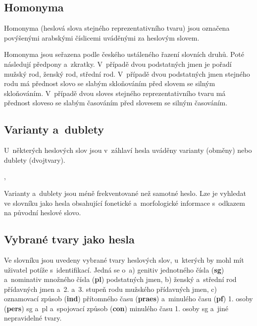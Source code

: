 \subsection*{Homonyma}

Homonyma (heslová slova stejného reprezentativního tvaru) jsou označena povýšenými arabskými číslicemi uváděnými za heslovým slovem.

\blspace
  \dicEntry {}  
  \dicEntry {}  
\blspace

Homonyma jsou seřazena podle českého ustáleného řazení slovních druhů. Poté následují předpony a~zkratky.
V~případě dvou podstatných jmen je pořadí mužský rod, ženský rod, střední rod. V~případě dvou podstatných jmen stejného rodu má přednost slovo se slabým skloňováním před slovem se silným skloňováním. V~případě dvou sloves stejného reprezentativního tvaru má přednost sloveso se slabým časováním před slovesem se silným časováním.

\subsection*{Varianty a~dublety}

U~některých heslových slov jsou v~záhlaví hesla uváděny varianty (obměny) nebo dublety (dvojtvary).

\blspace
  \dicEntry {},  
  \dicEntry {} 
\blspace

Varianty a~dublety jsou méně frekventované než samotné heslo. Lze je vyhledat ve slovníku jako hesla obsahující fonetické a~morfologické informace s~odkazem na původní heslové slovo.

\blspace
  \dicEntry {}    
  \dicEntry {}    
\blspace

\subsection*{Vybrané tvary jako hesla}

Ve slovníku jsou uvedeny vybrané tvary heslových slov, u~kterých by mohl mít uživatel potíže s~identifikací. Jedná se o~a) genitiv jednotného čísla ({\textbf{sg}}) a~nominativ množného čísla ({\textbf{pl}}) podstatných jmen, b) ženský a~střední rod přídavných jmen a~2. a~3. stupeň rodu mužského přídavných jmen, c) oznamovací způsob ({\textbf{ind}}) přítomného času ({\textbf{praes}}) a~minulého času ({\textbf{pf}}) 1. osoby ({\textbf{pers}}) sg a~pl a~spojovací způsob ({\textbf{con}}) minulého času 1. osoby sg a~jiné nepravidelné tvary.

